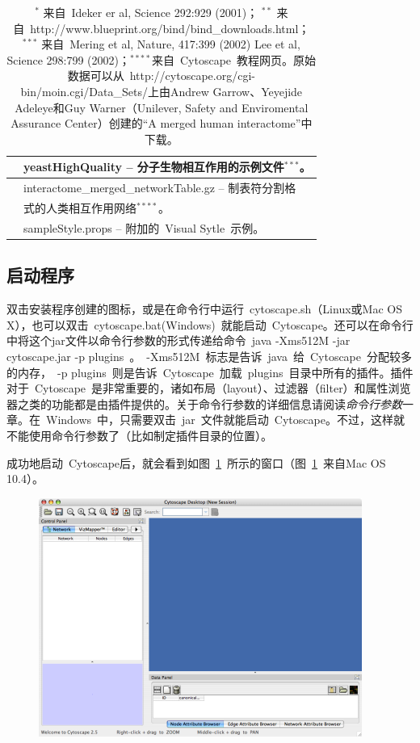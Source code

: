 \begin{table}[!h]
\begin{tabular}{|l|l|}
			\hline
				& yeastHighQuality -- 分子生物相互作用的示例文件$^{***}$。\\
			\hline
				\multirow{2}{*}{} & interactome\_{}merged\_{}networkTable.gz -- 制表符分割格\\ & 式的人类相互作用网络$^{****}$。\\
			\hline
				& sampleStyle.props -- 附加的~Visual Sytle~示例。\\
			\hline
		\end{tabular}
		\caption{$^*$ 来自~Ideker er al, Science 292:929 (2001)； $^{**}$ 来自~http://www.blueprint.org/bind/bind\_{}downloads.html； $^{***}$ 来自~Mering et al, Nature, 417:399 (2002) Lee et al, Science 298:799 (2002)；$^{****}$来自~Cytoscape~教程网页。原始数据可以从~http://cytoscape.org/cgi-bin/moin.cgi/Data\_{}Sets/上由Andrew Garrow、Yeyejide Adeleye和Guy Warner（Unilever, Safety and Enviromental Assurance Center）创建的“A merged human interactome”中下载。 }
		\label{table:3}
		\end{table}

	\subsection{启动程序}
		双击安装程序创建的图标，或是在命令行中运行~cytoscape.sh（Linux或Mac OS X），也可以双击~cytoscape.bat(Windows)~就能启动~Cytoscape。还可以在命令行中将这个jar文件以命令行参数的形式传递给命令~java -Xms512M -jar cytoscape.jar -p plugins~。~-Xms512M~标志是告诉~java~给~Cytoscape~分配较多的内存，~-p plugins~则是告诉~Cytoscape~加载~plugins~目录中所有的插件。插件对于~Cytoscape~是非常重要的，诸如布局（layout）、过滤器（filter）和属性浏览器之类的功能都是由插件提供的。关于命令行参数的详细信息请阅读\textit{命令行参数}一章。在~Windows~中，只需要双击~jar~文件就能启动~Cytoscape。不过，这样就不能使用命令行参数了（比如制定插件目录的位置）。

		成功地启动~Cytoscape后，就会看到如图~\ref{fig:1.1}~所示的窗口（图~\ref{fig:1.1}~来自Mac OS 10.4）。

		\begin{figure}[h]
			\includegraphics{images/cytoscape_startup_mac.png}
			\caption{}
			\label{fig:1.1}
		\end{figure}
